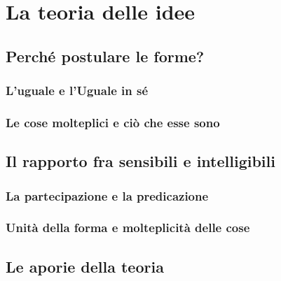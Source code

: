 \chapter{La teoria delle idee}
\label{cap:platone:idee}

\section{Perché postulare le forme?}

\subsection{L'uguale e l'Uguale in sé}

\subsection{Le cose molteplici e ciò che esse sono}

\section{Il rapporto fra sensibili e intelligibili}

\subsection{La partecipazione e la predicazione}

\subsection{Unità della forma e molteplicità delle cose}

\section{Le aporie della teoria}

